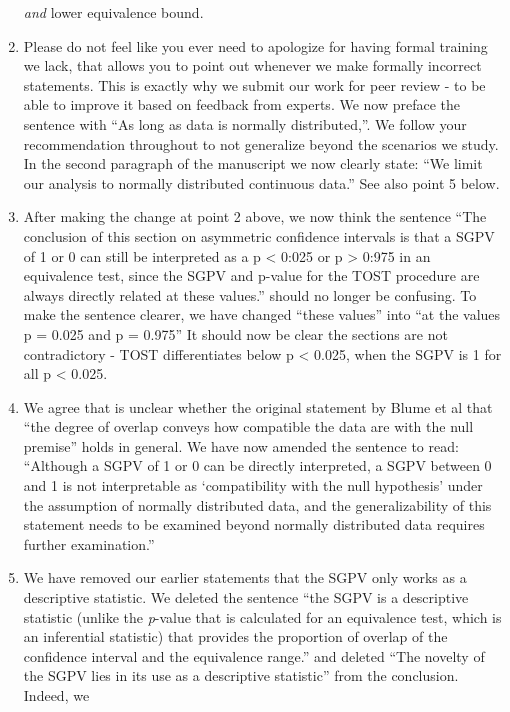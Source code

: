 \documentclass[man]{apa6}
\begin{document}
\begin{enumerate}
{  \emph{and} lower equivalence bound.}
\item
  Please do not feel like you ever need to apologize for having formal
  training we lack, that allows you to point out whenever we make
  formally incorrect statements. This is exactly why we submit our work
  for peer review - to be able to improve it based on feedback from
  experts. We now preface the sentence with \enquote{As long as data is
  normally distributed,}. We follow your recommendation throughout to
  not generalize beyond the scenarios we study. In the second paragraph
  of the manuscript we now clearly state: \enquote{We limit our analysis
  to normally distributed continuous data.} See also point 5 below.
\item
  After making the change at point 2 above, we now think the sentence
  \enquote{The conclusion of this section on asymmetric confidence
  intervals is that a SGPV of 1 or 0 can still be interpreted as a p
  \textless{} 0:025 or p \textgreater{} 0:975 in an equivalence test,
  since the SGPV and p-value for the TOST procedure are always directly
  related at these values.} should no longer be confusing. To make the
  sentence clearer, we have changed \enquote{these values} into
  \enquote{at the values p = 0.025 and p = 0.975} It should now be clear
  the sections are not contradictory - TOST differentiates below p
  \textless{} 0.025, when the SGPV is 1 for all p \textless{} 0.025.
\item
  We agree that is unclear whether the original statement by Blume et al
  that \enquote{the degree of overlap conveys how compatible the data
  are with the null premise} holds in general. We have now amended the
  sentence to read: \enquote{Although a SGPV of 1 or 0 can be directly
  interpreted, a SGPV between 0 and 1 is not interpretable as
  \enquote{compatibility with the null hypothesis} under the assumption
  of normally distributed data, and the generalizability of this
  statement needs to be examined beyond normally distributed data
  requires further examination.}
\item
  We have removed our earlier statements that the SGPV only works as a
  descriptive statistic. We deleted the sentence \enquote{the SGPV is a
  descriptive statistic (unlike the \emph{p}-value that is calculated
  for an equivalence test, which is an inferential statistic) that
  provides the proportion of overlap of the confidence interval and the
  equivalence range.} and deleted \enquote{The novelty of the SGPV lies
  in its use as a descriptive statistic} from the conclusion. Indeed, we

\end{enumerate}
\end{document}
